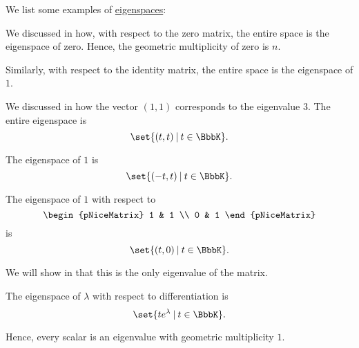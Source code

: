 \begin{example}\label{ex:def:eigenspace}
  We list some examples of \hyperref[def:eigenspace]{eigenspaces}:
  \begin{thmenum}
     We discussed in  how, with respect to the zero matrix, the entire space is the eigenspace of zero. Hence, the geometric multiplicity of zero is \( n \).

     Similarly, with respect to the identity matrix, the entire space is the eigenspace of \( 1 \).

     We discussed in  how the vector \( (1, 1) \) corresponds to the eigenvalue \( 3 \). The entire eigenspace is
    \begin{equation*}
      \set{ (t, t) \given t \in \BbbK }.
    \end{equation*}

    The eigenspace of \( 1 \) is
    \begin{equation*}
      \set{ (-t, t) \given t \in \BbbK }.
    \end{equation*}

     The eigenspace of \( 1 \) with respect to
    \begin{equation*}
      \begin{pNiceMatrix}
        1 & 1 \\
        0 & 1
      \end{pNiceMatrix}
    \end{equation*}
    is
    \begin{equation*}
      \set{ (t, 0) \given t \in \BbbK }.
    \end{equation*}

    We will show in  that this is the only eigenvalue of the matrix.

     The eigenspace of \( \lambda \) with respect to differentiation is
    \begin{equation*}
      \set{ t e^\lambda \given t \in \BbbK }.
    \end{equation*}

    Hence, every scalar is an eigenvalue with geometric multiplicity \( 1 \).
  \end{thmenum}
\end{example}

